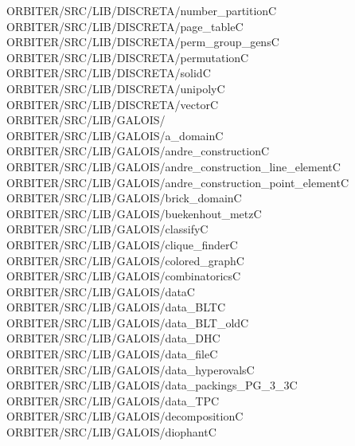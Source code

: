 \begin{tabbing}
ORBITER/SRC/LIB/DISCRETA/number\_partitionC\\[0pt]
ORBITER/SRC/LIB/DISCRETA/page\_tableC\\[0pt]
ORBITER/SRC/LIB/DISCRETA/perm\_group\_gensC\\[0pt]
ORBITER/SRC/LIB/DISCRETA/permutationC\\[0pt]
ORBITER/SRC/LIB/DISCRETA/solidC\\[0pt]
ORBITER/SRC/LIB/DISCRETA/unipolyC\\[0pt]
ORBITER/SRC/LIB/DISCRETA/vectorC\\[0pt]
ORBITER/SRC/LIB/GALOIS/\\[0pt]
ORBITER/SRC/LIB/GALOIS/a\_domainC\\[0pt]
ORBITER/SRC/LIB/GALOIS/andre\_constructionC\\[0pt]
ORBITER/SRC/LIB/GALOIS/andre\_construction\_line\_elementC\\[0pt]
ORBITER/SRC/LIB/GALOIS/andre\_construction\_point\_elementC\\[0pt]
ORBITER/SRC/LIB/GALOIS/brick\_domainC\\[0pt]
ORBITER/SRC/LIB/GALOIS/buekenhout\_metzC\\[0pt]
ORBITER/SRC/LIB/GALOIS/classifyC\\[0pt]
ORBITER/SRC/LIB/GALOIS/clique\_finderC\\[0pt]
ORBITER/SRC/LIB/GALOIS/colored\_graphC\\[0pt]
ORBITER/SRC/LIB/GALOIS/combinatoricsC\\[0pt]
ORBITER/SRC/LIB/GALOIS/dataC\\[0pt]
ORBITER/SRC/LIB/GALOIS/data\_BLTC\\[0pt]
ORBITER/SRC/LIB/GALOIS/data\_BLT\_oldC\\[0pt]
ORBITER/SRC/LIB/GALOIS/data\_DHC\\[0pt]
ORBITER/SRC/LIB/GALOIS/data\_fileC\\[0pt]
ORBITER/SRC/LIB/GALOIS/data\_hyperovalsC\\[0pt]
ORBITER/SRC/LIB/GALOIS/data\_packings\_PG\_3\_3C\\[0pt]
ORBITER/SRC/LIB/GALOIS/data\_TPC\\[0pt]
ORBITER/SRC/LIB/GALOIS/decompositionC\\[0pt]
ORBITER/SRC/LIB/GALOIS/diophantC\\[0pt]

\end{tabbing}
